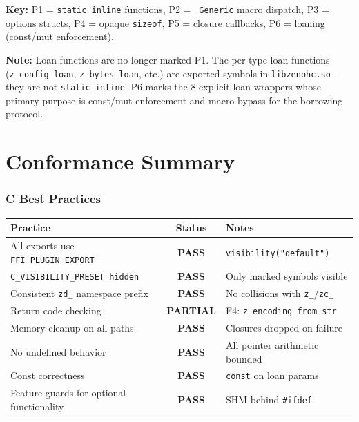 \documentclass[11pt,a4paper]{article}
\newcommand{\code}[1]{\texttt{#1}}
\newcommand{\file}[1]{\texttt{#1}}
\newcommand{\fn}[1]{\texttt{#1}}
\newcommand{\PASS}{\textcolor{passColor}{\textbf{PASS}}}
\newcommand{\PARTIAL}{\textcolor{partialColor}{\textbf{PARTIAL}}}
\begin{document}
\noindent
\textbf{Key:} P1 = \code{static inline} functions, P2 = \code{\_Generic}
macro dispatch, P3 = options structs, P4 = opaque \code{sizeof},
P5 = closure callbacks, P6 = loaning (const/mut enforcement).

\smallskip\noindent
\textbf{Note:} Loan functions are no longer marked P1. The per-type loan
functions (\fn{z\_config\_loan}, \fn{z\_bytes\_loan}, etc.) are exported
symbols in \file{libzenohc.so}---they are not \code{static inline}. P6
marks the 8 explicit loan wrappers whose primary purpose is const/mut
enforcement and macro bypass for the borrowing protocol.


\clearpage
\part{Conformance Summary}
\label{part:conformance}

\section{C Best Practices}

\begin{table}[ht]
\centering\small
\begin{tabularx}{\textwidth}{lcL}
  \toprule
  \textbf{Practice} & \textbf{Status} & \textbf{Notes} \\
  \midrule
  All exports use \code{FFI\_PLUGIN\_EXPORT}      & \PASS    & \code{visibility("default")} \\
  \code{C\_VISIBILITY\_PRESET hidden}             & \PASS    & Only marked symbols visible \\
  Consistent \code{zd\_} namespace prefix         & \PASS    & No collisions with \code{z\_}/\code{zc\_} \\
  Return code checking                             & \PARTIAL & F4: \fn{z\_encoding\_from\_str} \\
  Memory cleanup on all paths                      & \PASS    & Closures dropped on failure \\
  No undefined behavior                            & \PASS    & All pointer arithmetic bounded \\
  Const correctness                                & \PASS    & \code{const} on loan params \\
  Feature guards for optional functionality        & \PASS    & SHM behind \code{\#ifdef} \\
  \bottomrule
\end{tabularx}
\end{table}
\end{document}
